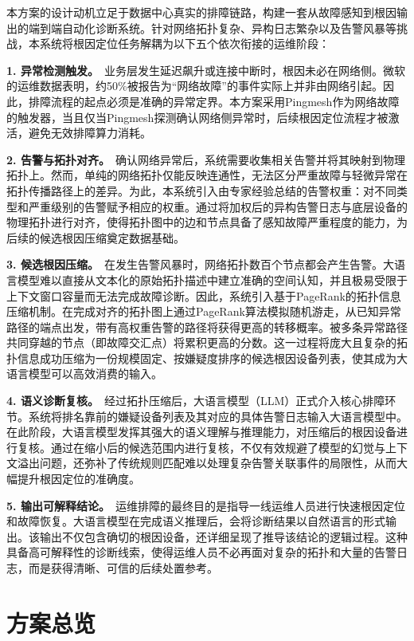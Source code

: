 本方案的设计动机立足于数据中心真实的排障链路，构建一套从故障感知到根因输出的端到端自动化诊断系统。针对网络拓扑复杂、异构日志繁杂以及告警风暴等挑战，本系统将根因定位任务解耦为以下五个依次衔接的运维阶段：

\textbf{1. 异常检测触发。}\ 业务层发生延迟飙升或连接中断时，根因未必在网络侧。微软的运维数据表明，约50\%被报告为“网络故障”的事件实际上并非由网络引起。因此，排障流程的起点必须是准确的异常定界。本方案采用Pingmesh作为网络故障的触发器，当且仅当Pingmesh探测确认网络侧异常时，后续根因定位流程才被激活，避免无效排障算力消耗。

\textbf{2. 告警与拓扑对齐。}\ 确认网络异常后，系统需要收集相关告警并将其映射到物理拓扑上。然而，单纯的网络拓扑仅能反映连通性，无法区分严重故障与轻微异常在拓扑传播路径上的差异。为此，本系统引入由专家经验总结的告警权重：对不同类型和严重级别的告警赋予相应的权重。通过将加权后的异构告警日志与底层设备的物理拓扑进行对齐，使得拓扑图中的边和节点具备了感知故障严重程度的能力，为后续的候选根因压缩奠定数据基础。

\textbf{3. 候选根因压缩。}\ 在发生告警风暴时，网络拓扑数百个节点都会产生告警。大语言模型难以直接从文本化的原始拓扑描述中建立准确的空间认知，并且极易受限于上下文窗口容量而无法完成故障诊断。因此，系统引入基于PageRank的拓扑信息压缩机制。在完成对齐的拓扑图上通过PageRank算法模拟随机游走，从已知异常路径的端点出发，带有高权重告警的路径将获得更高的转移概率。被多条异常路径共同穿越的节点（即故障交汇点）将累积更高的分数。这一过程将庞大且复杂的拓扑信息成功压缩为一份规模固定、按嫌疑度排序的候选根因设备列表，使其成为大语言模型可以高效消费的输入。

\textbf{4. 语义诊断复核。}\ 经过拓扑压缩后，大语言模型（LLM）正式介入核心排障环节。系统将排名靠前的嫌疑设备列表及其对应的具体告警日志输入大语言模型中。在此阶段，大语言模型发挥其强大的语义理解与推理能力，对压缩后的根因设备进行复核。通过在缩小后的候选范围内进行复核，不仅有效规避了模型的幻觉与上下文溢出问题，还弥补了传统规则匹配难以处理复杂告警关联事件的局限性，从而大幅提升根因定位的准确度。

\textbf{5. 输出可解释结论。}\ 运维排障的最终目的是指导一线运维人员进行快速根因定位和故障恢复。大语言模型在完成语义推理后，会将诊断结果以自然语言的形式输出。该输出不仅包含确切的根因设备，还详细呈现了推导该结论的逻辑过程。这种具备高可解释性的诊断线索，使得运维人员不必再面对复杂的拓扑和大量的告警日志，而是获得清晰、可信的后续处置参考。

\section{方案总览}

